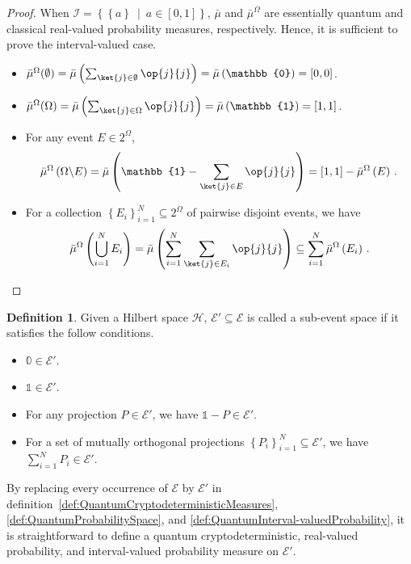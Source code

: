 \documentclass[12pt]{iopart}
\theoremstyle{plain}
\theoremstyle{definition}
\newtheorem{definition}[thm]{Definition}
\theoremstyle{remark}
\newcommand{\Hilb}{\mathcal{H}}
\newcommand{\events}{\ensuremath{\mathcal{E}}}
\newcommand{\proj}[1]{\op{#1}{#1}}
\newcommand{\set}[2]{\ensuremath{\left\{ {#1}~\middle|~{#2}\right\} }}
\begin{document}
\begin{proof}When $\mathscr{I}=\set{\left\{ a\right\} }{a\in\left[0,1\right]}$,
$\bar{\mu}$ and $\bar{\mu}^{\Omega}$ are essentially quantum and
classical real-valued probability measures, respectively. Hence, it
is sufficient to prove the interval-valued case.
\begin{itemize}
\item $\bar{\mu}^{\Omega}(\emptyset)=\bar{\mu}\left(\sum_{\ket{j}\in\emptyset}\proj{j}\right)=\bar{\mu}\left(\mathbb{0}\right)=[0,0]$. 
\item $\bar{\mu}^{\Omega}(\Omega)=\bar{\mu}\left(\sum_{\ket{j}\in\Omega}\proj{j}\right)=\bar{\mu}\left(\mathbb{1}\right)=[1,1]$. 
\item For any event $E\in2^{\Omega}$,
\begin{equation}
\bar{\mu}^{\Omega}\left(\Omega\backslash E\right)=\bar{\mu}\left(\mathbb{1}-\sum_{\ket{j}\in E}\proj{j}\right)=\left[1,1\right]-\bar{\mu}^{\Omega}\left(E\right)\,.
\end{equation}
\item For a collection $\left\{ E_{i}\right\} _{i=1}^{N}\subseteq2^{\Omega}$
of pairwise disjoint events, we have
\begin{equation}
\bar{\mu}^{\Omega}\left(\bigcup_{i=1}^{N}E_{i}\right)=\bar{\mu}\left(\sum_{i=1}^{N}\sum_{\ket{j}\in E_{i}}\proj{j}\right)\subseteq\sum_{i=1}^{N}\bar{\mu}^{\Omega}\left(E_{i}\right)\,.
\end{equation}
\end{itemize}
\end{proof}

\begin{definition}\label{def:sub-event-space}Given a Hilbert space
$\Hilb$, $\events'\subseteq\events$ is called a sub-event space
if it satisfies the follow conditions.
\begin{itemize}
\item $\mathbb{0}\in\events'$.
\item $\mathbb{1}\in\events'$.
\item For any projection $P\in\events'$, we have $\mathbb{1}-P\in\events'$.
\item For a set of mutually orthogonal projections $\left\{ P_{i}\right\} _{i=1}^{N}\subseteq\events'$,
we have $\sum_{i=1}^{N}P_{i}\in\events'$.
\end{itemize}
By replacing every occurrence of $\events$ by $\events'$ in definition~\ref{def:QuantumCryptodeterministicMeasures},
\ref{def:QuantumProbabilitySpace}, and \ref{def:QuantumInterval-valuedProbability},
it is straightforward to define a quantum cryptodeterministic, real-valued
probability, and interval-valued probability measure on $\events'$.\end{definition}
\end{document}
